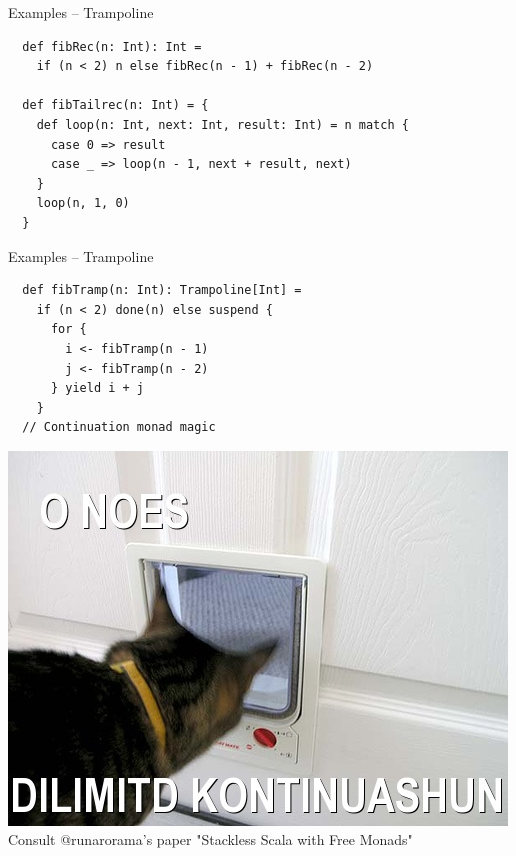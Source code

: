 \documentclass{beamer}
\begin{document}
\begin{frame}[fragile]{Examples -- Trampoline}
  \begin{verbatim}
  def fibRec(n: Int): Int =
    if (n < 2) n else fibRec(n - 1) + fibRec(n - 2)

  def fibTailrec(n: Int) = {
    def loop(n: Int, next: Int, result: Int) = n match {
      case 0 => result
      case _ => loop(n - 1, next + result, next)
    }
    loop(n, 1, 0)
  }
  \end{verbatim}
\end{frame}

\begin{frame}[fragile]{Examples -- Trampoline}
  \begin{verbatim}
  def fibTramp(n: Int): Trampoline[Int] =
    if (n < 2) done(n) else suspend {
      for {
        i <- fibTramp(n - 1)
        j <- fibTramp(n - 2)
      } yield i + j
    }
  // Continuation monad magic
  \end{verbatim}
  \includegraphics[scale=0.2]{img/cont}\newline
  Consult @runarorama's paper "Stackless Scala with Free Monads"
\end{frame}
\end{document}
